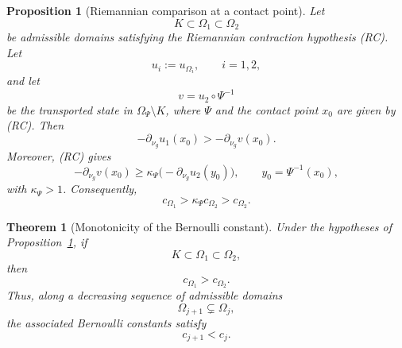 \documentclass[10pt,a4paper]{amsart}
\newtheorem{proposition}{Proposition}
\newtheorem{theorem}{Theorem}
\begin{document}
\begin{proposition}[Riemannian comparison at a contact point]
\label{prop:riemannian-contact-comparison}
Let
\[
K\subset\Omega_1\subset\Omega_2
\]
be admissible domains satisfying the Riemannian contraction hypothesis
{\rm (RC)}. Let
\[
u_i:=u_{\Omega_i},
\qquad i=1,2,
\]
and let
\[
v=u_2\circ\Psi^{-1}
\]
be the transported state in $\Omega_\Psi\setminus K$, where
$\Psi$ and the contact point $x_0$ are given by {\rm (RC)}. Then
\[
-\partial_{\nu_g}u_1(x_0)
>
-\partial_{\nu_g}v(x_0).
\label{eq:hopf-contact-comparison}
\]
Moreover, {\rm (RC)} gives
\[
-\partial_{\nu_g}v(x_0)
\geq
\kappa_\Psi
\bigl(-\partial_{\nu_g}u_2(y_0)\bigr),
\qquad
y_0=\Psi^{-1}(x_0),
\label{eq:RC-flux-comparison}
\]
with $\kappa_\Psi>1$. Consequently,
\begin{equation}
c_{\Omega_1}>\kappa_\Psi c_{\Omega_2}>c_{\Omega_2}.
\label{eq:riemannian-c-monotonicity}
\end{equation}
\end{proposition}

\begin{theorem}[Monotonicity of the Bernoulli constant]
\label{thm:monotonicity-c-riemannian}
Under the hypotheses of Proposition~\ref{prop:riemannian-contact-comparison},
if
\[
K\subset\Omega_1\subset\Omega_2,
\]
then
\[
c_{\Omega_1}>c_{\Omega_2}.
\]
Thus, along a decreasing sequence of admissible domains
\[
\Omega_{j+1}\subsetneq\Omega_j,
\]
the associated Bernoulli constants satisfy
\[
c_{j+1}<c_j.
\]
\end{theorem}
\end{document}
